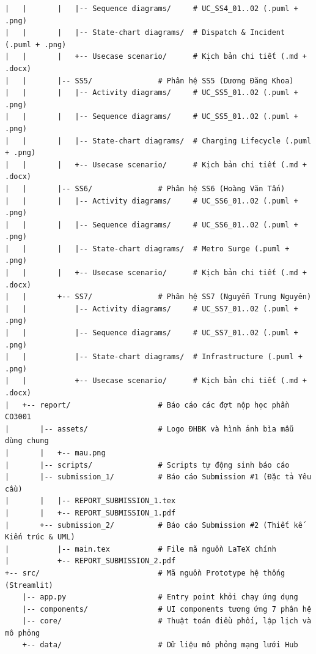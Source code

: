 \documentclass[12pt,a4paper]{article}
\begin{document}
{\begin{verbatim}
|   |       |   |-- Sequence diagrams/     # UC_SS4_01..02 (.puml + .png)
|   |       |   |-- State-chart diagrams/  # Dispatch & Incident (.puml + .png)
|   |       |   +-- Usecase scenario/      # Kịch bản chi tiết (.md + .docx)
|   |       |-- SS5/               # Phân hệ SS5 (Dương Đăng Khoa)
|   |       |   |-- Activity diagrams/     # UC_SS5_01..02 (.puml + .png)
|   |       |   |-- Sequence diagrams/     # UC_SS5_01..02 (.puml + .png)
|   |       |   |-- State-chart diagrams/  # Charging Lifecycle (.puml + .png)
|   |       |   +-- Usecase scenario/      # Kịch bản chi tiết (.md + .docx)
|   |       |-- SS6/               # Phân hệ SS6 (Hoàng Văn Tấn)
|   |       |   |-- Activity diagrams/     # UC_SS6_01..02 (.puml + .png)
|   |       |   |-- Sequence diagrams/     # UC_SS6_01..02 (.puml + .png)
|   |       |   |-- State-chart diagrams/  # Metro Surge (.puml + .png)
|   |       |   +-- Usecase scenario/      # Kịch bản chi tiết (.md + .docx)
|   |       +-- SS7/               # Phân hệ SS7 (Nguyễn Trung Nguyên)
|   |           |-- Activity diagrams/     # UC_SS7_01..02 (.puml + .png)
|   |           |-- Sequence diagrams/     # UC_SS7_01..02 (.puml + .png)
|   |           |-- State-chart diagrams/  # Infrastructure (.puml + .png)
|   |           +-- Usecase scenario/      # Kịch bản chi tiết (.md + .docx)
|   +-- report/                    # Báo cáo các đợt nộp học phần CO3001
|       |-- assets/                # Logo ĐHBK và hình ảnh bìa mẫu dùng chung
|       |   +-- mau.png
|       |-- scripts/               # Scripts tự động sinh báo cáo
|       |-- submission_1/          # Báo cáo Submission #1 (Đặc tả Yêu cầu)
|       |   |-- REPORT_SUBMISSION_1.tex
|       |   +-- REPORT_SUBMISSION_1.pdf
|       +-- submission_2/          # Báo cáo Submission #2 (Thiết kế Kiến trúc & UML)
|           |-- main.tex           # File mã nguồn LaTeX chính
|           +-- REPORT_SUBMISSION_2.pdf
+-- src/                           # Mã nguồn Prototype hệ thống (Streamlit)
    |-- app.py                     # Entry point khởi chạy ứng dụng
    |-- components/                # UI components tương ứng 7 phân hệ
    |-- core/                      # Thuật toán điều phối, lập lịch và mô phỏng
    +-- data/                      # Dữ liệu mô phỏng mạng lưới Hub
\end{verbatim}
}
\end{document}
